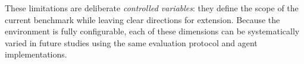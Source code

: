 These limitations are deliberate \emph{controlled variables}: they
define the scope of the current benchmark while leaving clear
directions for extension. Because the environment is fully
configurable, each of these dimensions can be systematically varied
in future studies using the same evaluation protocol and agent
implementations.
